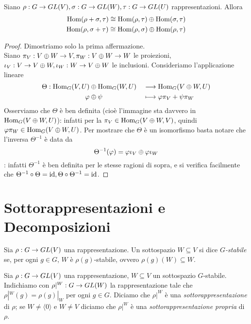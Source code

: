 \begin{proposition}
Siano $\rho:G\to GL(V),\allowbreak\sigma:G\to GL(W),\allowbreak\tau:G\to GL(U)$ rappresentazioni. Allora
\begin{align*}
\operatorname{Hom}(\rho+\sigma,\tau)\cong\operatorname{Hom}(\rho,\tau)\oplus\operatorname{Hom}(\sigma,\tau)\\
\operatorname{Hom}(\rho,\sigma+\tau)\cong\operatorname{Hom}(\rho,\sigma)\oplus\operatorname{Hom}(\rho,\tau)
\end{align*}
\end{proposition}
\begin{proof}
Dimostriamo solo la prima affermazione.\\
Siano $\pi_V:V\oplus W\to V,\allowbreak\pi_W:V\oplus W\to W$ le proiezioni, $\iota_V:V\to V\oplus W,\allowbreak\iota_W:W\to V\oplus W$ le inclusioni. Consideriamo l'applicazione lineare
\begin{alignat*}{2}
\Theta:\operatorname{Hom}_G(V,U)&\oplus\operatorname{Hom}_G(W,U)&&\longrightarrow\operatorname{Hom}_G(V\oplus W,U)\\
\varphi&\oplus\psi&&\longmapsto\varphi\pi_V+\psi\pi_W
\end{alignat*}
Osserviamo che $\Theta$ è ben definita (cioè l'immagine sta davvero in $\operatorname{Hom}_G(V\oplus W,U)$): infatti per la  $\pi_V\in\operatorname{Hom}_G(V\oplus W,V)$, quindi $\varphi\pi_W\in\operatorname{Hom}_G(V\oplus W,U)$. Per mostrare che $\Theta$ è un isomorfismo basta notare che l'inversa $\Theta^{-1}$ è data da
$$
\Theta^{-1}(\varphi)=\varphi\iota_V\oplus\varphi\iota_W
$$
: infatti $\Theta^{-1}$ è ben definita per le stesse ragioni di sopra, e si verifica facilmente che $\Theta^{-1}\circ\Theta=\operatorname{id},\allowbreak\Theta\circ\Theta^{-1}=\operatorname{id}$.
\end{proof}

\section{Sottorappresentazioni e Decomposizioni}

\begin{definition}
Sia $\rho:G\to GL(V)$ una rappresentazione. Un sottospazio $W\subseteq V$ si dice \emph{$G$-stabile} se, per ogni $g\in G$, $W$ è $\rho(g)$-stabile, ovvero $\rho(g)(W)\subseteq W$.
\end{definition}

\begin{definition}
Sia $\rho:G\to GL(V)$ una rappresentazione, $W\subseteq V$ un sottospazio $G$-stabile. Indichiamo con $\rho|^W:G\to GL(W)$ la rappresentazione tale che $\rho|^W(g)=\rho(g)|_W$ per ogni $g\in G$. Diciamo che $\rho|^W$ è una \emph{sottorappresentazione} di $\rho$; se $W\neq\langle0\rangle$ e $W\neq V$ diciamo che $\rho|^W$ è una \emph{sottorappresentazione propria} di $\rho$.
\end{definition}

